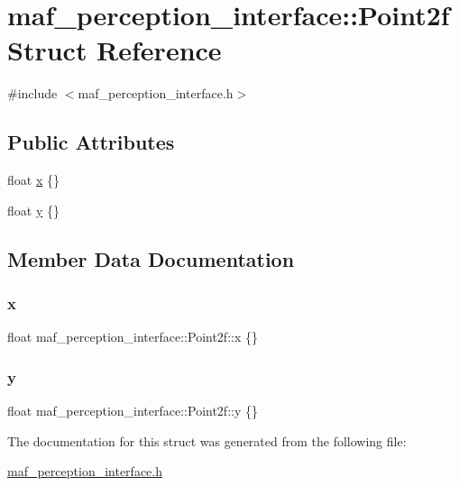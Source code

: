 \hypertarget{structmaf__perception__interface_1_1Point2f}{}\section{maf\+\_\+perception\+\_\+interface\+:\+:Point2f Struct Reference}
\label{structmaf__perception__interface_1_1Point2f}


{\ttfamily \#include $<$maf\+\_\+perception\+\_\+interface.\+h$>$}

\subsection*{Public Attributes}
\begin{DoxyCompactItemize}
\item 
float \hyperlink{structmaf__perception__interface_1_1Point2f_a63057504ec6ca8aed8347c9a4ba80ddb}{x} \{\}
\item 
float \hyperlink{structmaf__perception__interface_1_1Point2f_a23b000dc11cf6ee6f40f846f6c232eda}{y} \{\}
\end{DoxyCompactItemize}


\subsection{Member Data Documentation}
\mbox{\label{structmaf__perception__interface_1_1Point2f_a63057504ec6ca8aed8347c9a4ba80ddb}} 
\subsubsection{\texorpdfstring{x}{x}}
{\footnotesize\ttfamily float maf\+\_\+perception\+\_\+interface\+::\+Point2f\+::x \{\}}

\mbox{\label{structmaf__perception__interface_1_1Point2f_a23b000dc11cf6ee6f40f846f6c232eda}} 
\subsubsection{\texorpdfstring{y}{y}}
{\footnotesize\ttfamily float maf\+\_\+perception\+\_\+interface\+::\+Point2f\+::y \{\}}



The documentation for this struct was generated from the following file\+:\begin{DoxyCompactItemize}
\item 
\hyperlink{maf__perception__interface_8h}{maf\+\_\+perception\+\_\+interface.\+h}\end{DoxyCompactItemize}
